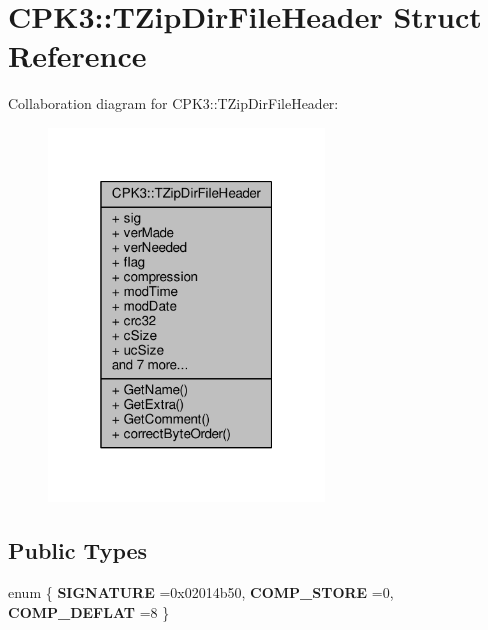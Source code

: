 \hypertarget{structCPK3_1_1TZipDirFileHeader}{}\section{C\+P\+K3\+:\+:T\+Zip\+Dir\+File\+Header Struct Reference}
\label{structCPK3_1_1TZipDirFileHeader}


Collaboration diagram for C\+P\+K3\+:\+:T\+Zip\+Dir\+File\+Header\+:
\nopagebreak
\begin{figure}[H]
\begin{center}
\leavevmode
\includegraphics[width=208pt]{db/de6/structCPK3_1_1TZipDirFileHeader__coll__graph}
\end{center}
\end{figure}
\subsection*{Public Types}
\begin{DoxyCompactItemize}
\item 
enum \{ {\bfseries S\+I\+G\+N\+A\+T\+U\+RE} =0x02014b50, 
{\bfseries C\+O\+M\+P\+\_\+\+S\+T\+O\+RE} =0, 
{\bfseries C\+O\+M\+P\+\_\+\+D\+E\+F\+L\+AT} =8
 \}\hypertarget{structCPK3_1_1TZipDirFileHeader_aa7df5446f72cdf3c122437c28497f1f0}{}\label{structCPK3_1_1TZipDirFileHeader_aa7df5446f72cdf3c122437c28497f1f0}

\end{DoxyCompactItemize}
